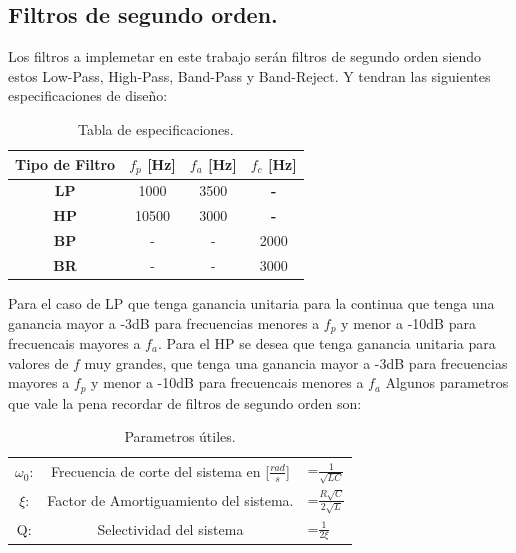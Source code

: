 \documentclass[a4paper]{article}
\begin{document}
\subsection{Filtros de segundo orden.}
Los filtros a implemetar en este trabajo serán filtros de segundo orden siendo estos Low-Pass, High-Pass, Band-Pass y Band-Reject. Y tendran las siguientes especificaciones de diseño:
\begin{table}[H]
\begin{center}
\begin{tabular}{|c|c|c|c|}
\hline
\textbf{Tipo de Filtro} & \textbf{$f_p$ [Hz]} & \textbf{$f_a$ [Hz]} & \textbf{$f_c$ [Hz]} \\ \hline
\textbf{LP}             & 1000                & 3500                & \textbf{-}          \\ \hline
\textbf{HP}             & 10500               & 3000                & \textbf{-}          \\ \hline
\textbf{BP}             & -                   & -                   & 2000                \\ \hline
\textbf{BR}             & -                   & -                   & 3000                \\ \hline
\end{tabular}
\caption{Tabla de especificaciones.}
\label{tab:specs}
\end{center}
\end{table}
Para el caso de LP que tenga ganancia unitaria para la continua que tenga una ganancia mayor a -3dB para frecuencias menores a $f_p$ y menor a -10dB para frecuencais mayores a $f_a$. Para el HP se desea que tenga ganancia unitaria para valores de $f$ muy grandes, que tenga una ganancia mayor a -3dB para frecuencias mayores a $f_p$ y menor a -10dB para frecuencais menores a $f_a$
Algunos parametros que vale la pena recordar de filtros de segundo orden son:
\begin{table}[H]
\begin{center}
\begin{tabular}{c|cl}
$\omega_0$: & Frecuencia de corte del sistema en [$\frac{rad}{s}$] & =$\frac{1}{\sqrt{LC}}$         \\
$\xi$:      & Factor de Amortiguamiento del sistema.               & =$\frac{R\sqrt{C}}{2\sqrt{L}}$ \\
Q:          & Selectividad del sistema                             & =$\frac{1}{2\xi}$             
\end{tabular}
\end{center}
\caption{Parametros útiles.}
\label{tab:utils}
\end{table}
\end{document}
